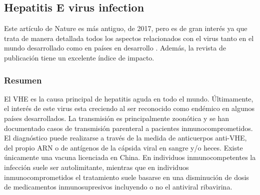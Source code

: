 \documentclass[11 pt]{article}
\begin{document}
\subsection{Hepatitis E virus infection}
Este artículo de Nature es más antiguo, de 2017, pero es de gran interés ya que trata de manera detallada todos los aspectos relacionados con el virus tanto en el mundo desarrollado como en países en desarrollo \cite{Kamar2017}. Además, la revista de publicación tiene un excelente índice de impacto.
\subsubsection{Resumen}
El VHE es la causa principal de hepatitis aguda en todo el mundo. Últimamente, el interés de este virus esta creciendo al ser reconocido como endémico en algunos países desarrollados. La transmisión es principalmente zoonótica y se han documentado casos de transmisión parenteral a pacientes inmunocomprometidos. El diagnóstico puede realizarse a través de la medida de anticuerpos anti-VHE, del propio ARN o de antígenos de la cápsida viral en sangre y/o heces. Existe únicamente una vacuna licenciada en China. En individuos inmunocompetentes la infección suele ser autolimitante, mientras que en individuos inmunocomprometidos el tratamiento suele basarse en una disminución de dosis de medicamentos inmunosupresivos incluyendo o no el antiviral ribavirina. 
\end{document}
